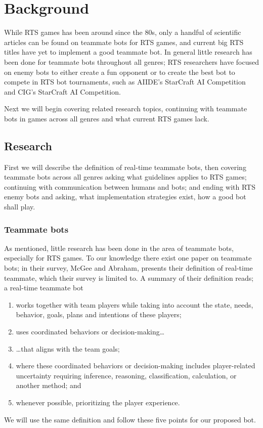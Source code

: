 \chapter{Background} While RTS games has been around since the 80s\cite{adams06, rtsHistory}, only a
handful of scientific articles can be found on teammate bots for RTS games, and current big RTS
titles have yet to implement a good teammate bot. In general little research has been done for
teammate bots throughout all genres; RTS researchers have focused on enemy bots to either create a
fun opponent\cite{hagelback09} or to create the best bot to compete in RTS bot tournaments, such as
AIIDE's StarCraft AI Competition\cite{scaiide} and CIG's StarCraft AI Competition\cite{sccig}.

Next we will begin covering related research topics, continuing with teammate bots in games across
all genres and what current RTS games lack.

\section{Research}
First we will describe the definition of real-time teammate bots, then covering teammate bots across
all genres asking what guidelines applies to RTS games; continuing with communication between humans
and bots; and ending with RTS enemy bots and asking, what implementation strategies exist, how a good
bot shall play.

\subsection{Teammate bots} \label{sec:teammate_bots} As mentioned, little
research has been done in the area of teammate bots, especially for RTS games. To our knowledge
there exist one paper on teammate bots\cite{mcgee10}; in their survey, McGee and Abraham, presents
their definition of real-time teammate, which their survey is limited to. A summary of their
definition reads; a real-time teammate bot
\begin{enumerate}
	\item works together with team players while taking into account the state, needs, behavior,
	  goals, plans and intentions of these players;
	\item uses coordinated behaviors or decision-making\ldots
	\item {\ldots}that aligns with the team goals;
	\item where these coordinated behaviors or decision-making includes player-related uncertainty
	  requiring inference, reasoning, classification, calculation, or another method; and
	\item whenever possible, prioritizing the player experience.
\end{enumerate}
We will use the same definition and follow these five points for our proposed bot.

